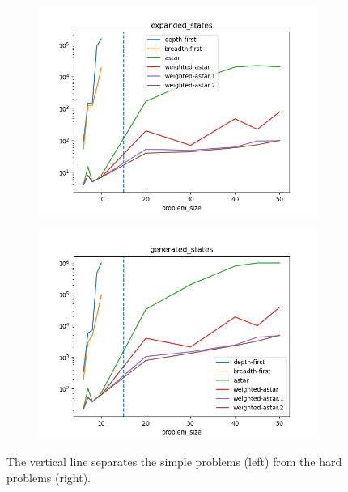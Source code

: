 \documentclass[12pt]{article}
\begin{document}
\begin{figure}
\begin{subfigure}[]{.49\textwidth}
        \includegraphics[width=\textwidth]{figures/expanded_states.png}
        \caption{}
    \end{subfigure}
    \begin{subfigure}[]{.49\textwidth}
        \includegraphics[width=\textwidth]{figures/generated_states.png}
        \caption{}
    \end{subfigure}
    \caption{The vertical line separates the simple problems (left) from the hard problems (right).}
    \label{3.3}
\end{figure}
\end{document}
